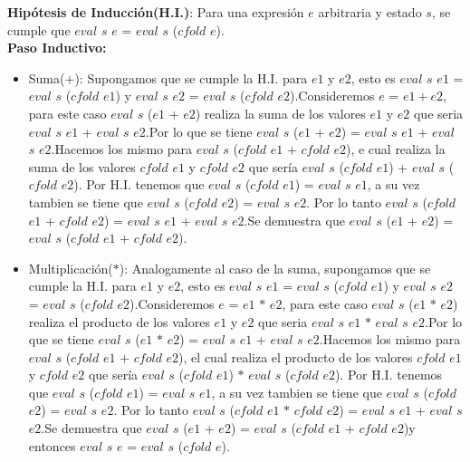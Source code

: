 \documentclass{article}
\begin{document}
\begin{itemize}
\begin{itemize}
                \textbf{Hipótesis de Inducción(H.I.)}: Para una expresión $e$ arbitraria y estado $s$, se cumple que $eval$ $s$ $e$ = $eval$ $s$ ($cfold$ $e$).\\

                \textbf{Paso Inductivo:}
                \begin{itemize}
                    \item Suma($+$): Supongamos que se cumple la H.I. para $e1$ y $e2$, esto es $eval$ $s$ $e1$ = $eval$ $s$ ($cfold$ $e1$) y $eval$ $s$ $e2$ = $eval$ $s$ ($cfold$ $e2$).Consideremos $e$ = $e1 + e2$, para este caso $eval$ $s$ ($e1$ + $e2$) realiza la suma de los valores $e1$ y $e2$ que seria $eval$ $s$ $e1$ + $eval$ $s$ $e2$.Por lo que se tiene $eval$ $s$ ($e1$ + $e2$) = $eval$ $s$ $e1$ + $eval$ $s$ $e2$.Hacemos los mismo para $eval$ $s$ ($cfold$ $e1$ + $cfold$ $e2$), e cual realiza la suma de los valores $cfold$ $e1$ y $cfold$ $e2$ que sería $eval$ $s$ ($cfold$ $e1$) + $eval$ $s$ ($cfold$ $e2$). Por H.I. tenemos que $eval$ $s$ ($cfold$ $e1$) = $eval$ $s$ $e1$, a su vez tambien se tiene que $eval$ $s$ ($cfold$ $e2$) = $eval$ $s$ $e2$. Por lo tanto $eval$ $s$ ($cfold$ $e1$ + $cfold$ $e2$) = $eval$ $s$ $e1$ + $eval$ $s$ $e2$.Se demuestra que $eval$ $s$ ($e1$ + $e2$) = $eval$ $s$ ($cfold$ $e1$ + $cfold$ $e2$).\\

                    \item Multiplicación($*$): Analogamente al caso de la suma, supongamos que se cumple la H.I. para $e1$ y $e2$, esto es $eval$ $s$ $e1$ = $eval$ $s$ ($cfold$ $e1$) y $eval$ $s$ $e2$ = $eval$ $s$ ($cfold$ $e2$).Consideremos $e$ = $e1$ $*$ $e2$, para este caso $eval$ $s$ ($e1$ $*$ $e2$) realiza el producto de los valores $e1$ y $e2$ que seria $eval$ $s$ $e1$ $*$ $eval$ $s$ $e2$.Por lo que se tiene $eval$ $s$ ($e1$ $*$ $e2$) = $eval$ $s$ $e1$ + $eval$ $s$ $e2$.Hacemos los mismo para $eval$ $s$ ($cfold$ $e1$ + $cfold$ $e2$), el cual realiza el producto de los valores $cfold$ $e1$ y $cfold$ $e2$ que sería $eval$ $s$ ($cfold$ $e1$) $*$ $eval$ $s$ ($cfold$ $e2$). Por H.I. tenemos que $eval$ $s$ ($cfold$ $e1$) = $eval$ $s$ $e1$, a su vez tambien se tiene que $eval$ $s$ ($cfold$ $e2$) = $eval$ $s$ $e2$. Por lo tanto $eval$ $s$ ($cfold$ $e1$ $*$ $cfold$ $e2$) = $eval$ $s$ $e1$ + $eval$ $s$ $e2$.Se demuestra que $eval$ $s$ ($e1$ + $e2$) = $eval$ $s$ ($cfold$ $e1$ + $cfold$ $e2$)y entonces $eval$ $s$ $e$ = $eval$ $s$ ($cfold$ $e$).\\


\end{itemize}
\end{itemize}
\end{itemize}
\end{document}

